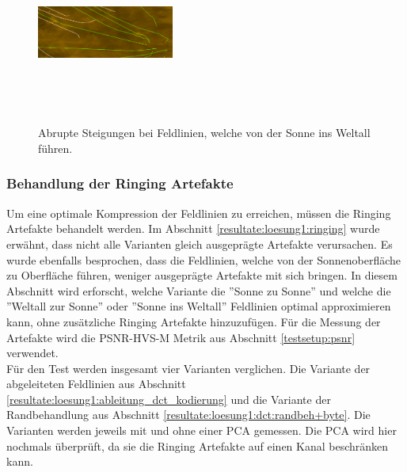 \begin{figure}[!htbp]
\center
\includegraphics[width=0.4\textwidth,height=6cm,keepaspectratio]{./pictures/resultate/loesung1/ringing/haar-like.png}
	\caption{Abrupte Steigungen bei Feldlinien, welche von der Sonne ins Weltall führen.}
	\label{resultate:loesung1:dct:randbehandlung:harte_richtungswechsel}
\end{figure}

\subsubsection{Behandlung der Ringing Artefakte} \label{resultate:loesung1:behandlung_ringing}
Um eine optimale Kompression der Feldlinien zu erreichen, müssen die Ringing Artefakte behandelt werden. Im Abschnitt \ref{resultate:loesung1:ringing} wurde erwähnt, dass nicht alle Varianten gleich ausgeprägte Artefakte verursachen. Es wurde ebenfalls besprochen, dass die Feldlinien, welche von der Sonnenoberfläche zu Oberfläche führen, weniger ausgeprägte Artefakte mit sich bringen. In diesem Abschnitt wird erforscht, welche Variante die ''Sonne zu Sonne'' und welche die ''Weltall zur Sonne'' oder ''Sonne ins Weltall'' Feldlinien optimal approximieren kann, ohne zusätzliche Ringing Artefakte hinzuzufügen. Für die Messung der Artefakte wird die PSNR-HVS-M Metrik aus Abschnitt \ref{testsetup:psnr} verwendet.\\
Für den Test werden insgesamt vier Varianten verglichen. Die Variante der abgeleiteten Feldlinien aus Abschnitt \ref{resultate:loesung1:ableitung_dct_kodierung} und die Variante der Randbehandlung aus Abschnitt \ref{resultate:loesung1:dct:randbeh+byte}. Die Varianten werden jeweils mit und ohne einer PCA gemessen. Die PCA wird hier nochmals überprüft, da sie die Ringing Artefakte auf einen Kanal beschränken kann.

